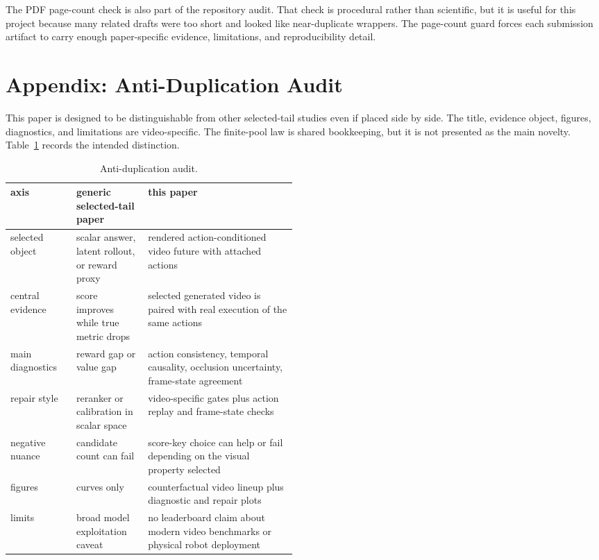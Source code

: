 \documentclass{article}
\begin{document}
The PDF page-count check is also part of the repository audit. That check is procedural rather than scientific, but it is useful for this project because many related drafts were too short and looked like near-duplicate wrappers. The page-count guard forces each submission artifact to carry enough paper-specific evidence, limitations, and reproducibility detail.

\section{Appendix: Anti-Duplication Audit}
\label{app:anti-dup}

This paper is designed to be distinguishable from other selected-tail studies even if placed side by side. The title, evidence object, figures, diagnostics, and limitations are video-specific. The finite-pool law is shared bookkeeping, but it is not presented as the main novelty. Table~\ref{tab:anti-dup} records the intended distinction.

\begin{table}[tbp]
  \centering
  \small
  \caption{Anti-duplication audit.}
  \label{tab:anti-dup}
  \begin{tabularx}{\linewidth}{@{}p{0.23\linewidth}p{0.25\linewidth}X@{}}
    \toprule
    axis & generic selected-tail paper & this paper \\
    \midrule
    selected object & scalar answer, latent rollout, or reward proxy & rendered action-conditioned video future with attached actions \\
    central evidence & score improves while true metric drops & selected generated video is paired with real execution of the same actions \\
    main diagnostics & reward gap or value gap & action consistency, temporal causality, occlusion uncertainty, frame-state agreement \\
    repair style & reranker or calibration in scalar space & video-specific gates plus action replay and frame-state checks \\
    negative nuance & candidate count can fail & score-key choice can help or fail depending on the visual property selected \\
    figures & curves only & counterfactual video lineup plus diagnostic and repair plots \\
    limits & broad model exploitation caveat & no leaderboard claim about modern video benchmarks or physical robot deployment \\
    \bottomrule
  \end{tabularx}
\end{table}
\end{document}

